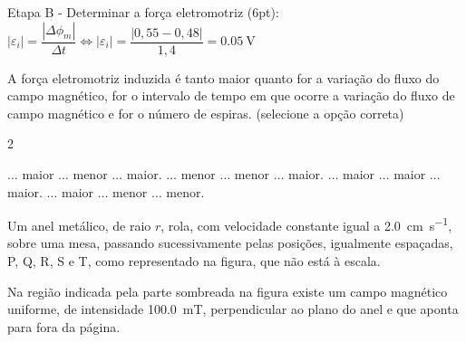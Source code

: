 \documentclass[addpoints, answers]{exam}
\begin{document}
\begin{questions}
\begin{solution}
{				Etapa B - Determinar a força eletromotriz (6pt):\\
				$|\varepsilon_i| = \dfrac{|\Delta \phi_m|}{\Delta t} \Leftrightarrow |\varepsilon_i| = \dfrac{|0,55-0,48|}{1,4} = \SI{0,05}{\volt}$
			}
		\end{solution}
		
		\question[8] A força eletromotriz induzida é tanto maior quanto \underline{\hspace{50pt}} for a variação do fluxo do campo magnético, \underline{\hspace{50pt}} for o intervalo de tempo em que ocorre a variação do fluxo de campo magnético e \underline{\hspace{50pt}} for o número de espiras. (selecione a opção correta)
		
		\begin{multicols}{2}
			\begin{choices}
				\correctchoice $\ldots$ maior $\ldots$ menor $\ldots$ maior.
				\choice $\ldots$ menor $\ldots$ menor $\ldots$ maior.
				\choice $\ldots$ maior $\ldots$ maior $\ldots$ maior.
				\choice $\ldots$ maior $\ldots$ menor $\ldots$ menor.
			\end{choices}
		\end{multicols}

		
		\question Um anel metálico, de raio $r$, rola, com velocidade constante igual a \SI{2,0}{\centi\meter\per\second}, sobre uma mesa, passando sucessivamente pelas posições, igualmente espaçadas, P, Q, R, S e T, como representado na figura, que não está à escala.\\
		
		\begin{minipage}{0.4\textwidth}
			Na região indicada pela parte sombreada na figura existe um campo magnético uniforme, de intensidade \SI{100,0}{\milli\tesla}, perpendicular ao plano do anel e que aponta para fora da página.
		\end{minipage}
		\hspace{0.1\textwidth}
		\begin{minipage}{0.4\textwidth}
\end{minipage}
\end{questions}
\end{document}
